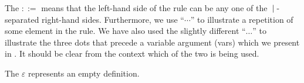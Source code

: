 The $\mathbf{::=}$ means that the left-hand side of the rule can be any one of
the $\: | \:$-separated right-hand sides. Furthermore, we use ``$\cdots$'' to
illustrate a repetition of some element in the rule. We have also used the
slightly different ``$\dots$'' to illustrate the three dots that precede a
variable argument (vars) which we present in .
It should be clear from the context which of the two is being used.

The $\varepsilon$ represents an empty definition.

